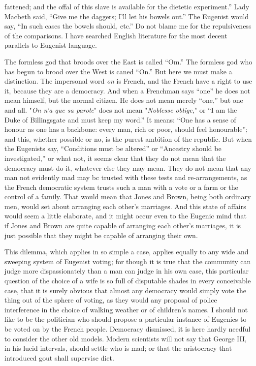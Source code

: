 \documentclass{book}
\begin{document}
fattened; and the offal of this slave is available for the dietetic experiment.” Lady Macbeth said, “Give me the daggers; I’ll let his bowels out.” The Eugenist would say, “In such cases the bowels should, etc.” Do not blame me for the repulsiveness of the comparisons. I have searched English literature for the most decent parallels to Eugenist language.

The formless god that broods over the East is called “Om.” The formless god who has begun to brood over the West is caned “On.” But here we must make a distinction. The impersonal word \emph{on} is French, and the French have a right to use it, because they are a democracy. And when a Frenchman says “one” he does not mean himself, but the normal citizen. He does not mean merely “one,” but one and all. "\emph{On n’a que sa parole}" does not mean "\emph{Noblesse oblige,}" or “I am the Duke of Billingsgate and must keep my word.” It means: “One has a sense of honour as one has a backbone: every man, rich or poor, should feel honourable”; and this, whether possible or no, is the purest ambition of the republic. But when the Eugenists say, “Conditions must be altered” or “Ancestry should be investigated,” or what not, it seems clear that they do not mean that the democracy must do it, whatever else they may mean. They do not mean that any man not evidently mad may bc trusted with these tests and re-arrangements, as the French democratic system trusts such a man with a vote or a farm or the control of a family. That would mean that Jones and Brown, being both ordinary men, would set about arranging each other’s marriages. And this state of affairs would seem a little elaborate, and it might occur even to the Eugenic mind that if Jones and Brown are quite capable of arranging each other’s marriages, it is just possible that they might be capable of arranging their own.

This dilemma, which applies in so simple a case, applies equally to any wide and sweeping system of Eugenist voting; for though it is true that the community can judge more dispassionately than a man can judge in his own case, this particular question of the choice of a wife is so full of disputable shades in every conceivable case, that it is surely obvious that almost any democracy would simply vote the thing out of the sphere of voting, as they would any proposal of police interference in the choice of walking weather or of children’s names. I should not like to be the politician who should propose a particular instance of Eugenics to be voted on by the French people. Democracy dismissed, it is here hardly needful to consider the other old models. Modern scientists will not say that George III, in his lucid intervals, should settle who is mad; or that the aristocracy that introduced gout shall supervise diet.
\end{document}

